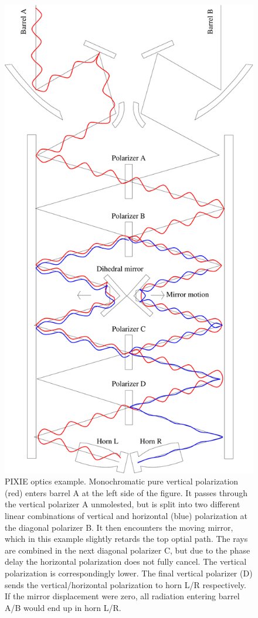 \documentclass{article}
\begin{document}
\begin{figure}
	\centering
	\includegraphics[angle=90,width=170mm]{plots/optics_ex1.pdf}
	\caption{PIXIE optics example. Monochromatic pure vertical polarization (red) enters barrel
	A at the left side of the figure. It passes through the vertical polarizer A
	unmolested, but is split into two different linear combinations of vertical
	and horizontal (blue) polarization at the diagonal polarizer B. It then encounters
	the moving mirror, which in this example slightly retards the top optial path.
	The rays are combined in the next diagonal polarizer C, but due to the
	phase delay the horizontal polarization does not fully cancel. The vertical
	polarization is correspondingly lower. The final vertical polarizer (D)
	sends the vertical/horizontal polarization to horn L/R respectively.
	If the mirror displacement were zero, all radiation entering barrel A/B
	would end up in horn L/R.}
\end{figure}
\end{document}
